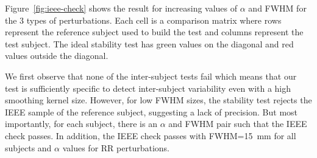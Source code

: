 \documentclass[lettersize,journal]{IEEEtran}
\begin{document}
Figure~\ref{fig:ieee-check} shows the result for increasing values of $\alpha$ and FWHM for the 3 types of perturbations. Each cell is a comparison matrix where rows represent the reference subject used to build the test and columns represent the test subject. The ideal stability test has green values on the diagonal and red values outside the diagonal.

We first observe that none of the inter-subject tests fail which means that our test is sufficiently specific to detect inter-subject variability even with a high smoothing kernel size. However, for low FWHM sizes, the stability test rejects the IEEE sample of the reference subject, suggesting a lack of precision. But most importantly, for each subject, there is an $\alpha$ and FWHM pair such that the IEEE check passes. In addition, the IEEE check passes with FWHM=15~mm for all subjects and $\alpha$ values for RR perturbations.
\end{document}
